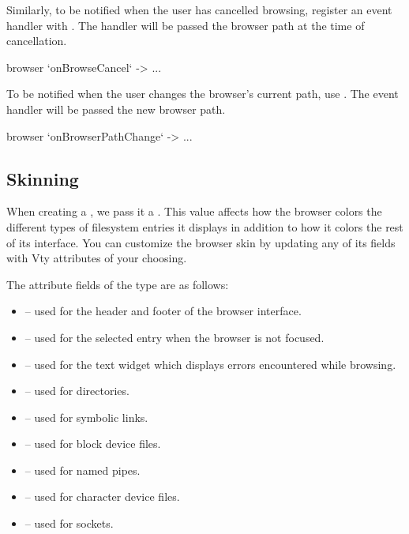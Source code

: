 Similarly, to be notified when the user has cancelled browsing,
register an event handler with .  The handler will
be passed the browser path at the time of cancellation.

\begin{haskellcode}
 browser `onBrowseCancel` \path -> ...
\end{haskellcode}

To be notified when the user changes the browser's current path, use
.  The event handler will be passed the new
browser path.

\begin{haskellcode}
 browser `onBrowserPathChange` \path -> ...
\end{haskellcode}

\subsection{Skinning}

When creating a , we pass it a .  This
value affects how the browser colors the different types of filesystem
entries it displays in addition to how it colors the rest of its
interface.  You can customize the browser skin by updating any of its
fields with Vty attributes of your choosing.


The attribute fields of the  type are as follows:

\begin{itemize}
\item {} -- used for the header and footer of the
  browser interface.
\item {} -- used for the selected entry when
  the browser is not focused.
\item {} -- used for the text widget which displays
  errors encountered while browsing.
\item {} -- used for directories.
\item {} -- used for symbolic links.
\item {} -- used for block device files.
\item {} -- used for named pipes.
\item {} -- used for character device files.
\item {} -- used for sockets.
\end{itemize}

